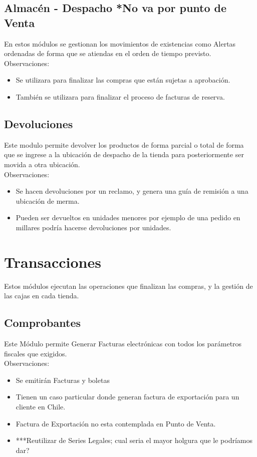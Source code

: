 \documentclass[pdftex,12pt,oneside,a4paper,spanish, english, brazil]{abntex2}
\begin{document}
\begin{sloppypar}
              \subsection{Almacén - Despacho *No va por punto de Venta}
              En estos módulos se gestionan los movimientos de existencias como Alertas ordenadas de forma que se atiendas en el orden de tiempo previsto.
              Observaciones:
              \begin{itemize}
              	\item Se utilizara para finalizar las compras que están sujetas a aprobación.
              	\item También se utilizara para finalizar el proceso de facturas de reserva.
              \end{itemize}
              \subsection{Devoluciones}
              Este modulo permite devolver los productos de forma parcial o total de forma que se ingrese a la ubicación de despacho de la tienda para posteriormente ser movida a otra ubicación.\\
              Observaciones:
              \begin{itemize}
              	\item Se hacen devoluciones por un reclamo, y genera una guía de remisión a una ubicación de merma.
              	\item Pueden ser devueltos en unidades menores por ejemplo de una pedido en millares podría hacerse devoluciones por unidades.
              \end{itemize}
              \section{Transacciones}
              Estos módulos ejecutan las operaciones que finalizan las compras, y la gestión de las cajas en cada tienda.
              \subsection{Comprobantes}
              Este Módulo permite Generar Facturas electrónicas con todos los parámetros fiscales que exigidos.\\
              Observaciones:
              \begin{itemize}
              	\item Se emitirán Facturas y boletas
              	\item Tienen un caso particular donde generan factura de exportación para un cliente en Chile.
              	\item Factura de Exportación no esta contemplada en Punto de Venta.
              	\item ***Reutilizar de Series Legales; cual seria el mayor holgura que le podríamos dar?
              \end{itemize}

\end{sloppypar}
\end{document}
